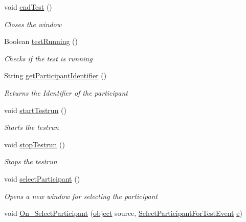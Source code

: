 \begin{DoxyCompactItemize}
void \hyperlink{class_web_analyzer_1_1_u_i_1_1_interaction_objects_1_1_testrun_control_afa240c157d4dca3e5399625cf59afd8c}{end\+Test} ()
\begin{DoxyCompactList}\small\item\em Closes the window \end{DoxyCompactList}\item 
Boolean \hyperlink{class_web_analyzer_1_1_u_i_1_1_interaction_objects_1_1_testrun_control_ae1dacc2d3e11d88116b3dbf9c45ea403}{test\+Running} ()
\begin{DoxyCompactList}\small\item\em Checks if the test is running \end{DoxyCompactList}\item 
String \hyperlink{class_web_analyzer_1_1_u_i_1_1_interaction_objects_1_1_testrun_control_a91ae8944392f8e0aef79106e157091a6}{get\+Participant\+Identifier} ()
\begin{DoxyCompactList}\small\item\em Returns the Identifier of the participant \end{DoxyCompactList}\item 
void \hyperlink{class_web_analyzer_1_1_u_i_1_1_interaction_objects_1_1_testrun_control_af27f7dfe9f65ab63b139bc58873eb689}{start\+Testrun} ()
\begin{DoxyCompactList}\small\item\em Starts the testrun \end{DoxyCompactList}\item 
void \hyperlink{class_web_analyzer_1_1_u_i_1_1_interaction_objects_1_1_testrun_control_a5f0c295b6abbeade6416f7a8fec63d70}{stop\+Testrun} ()
\begin{DoxyCompactList}\small\item\em Stops the testrun \end{DoxyCompactList}\item 
void \hyperlink{class_web_analyzer_1_1_u_i_1_1_interaction_objects_1_1_testrun_control_ad6ef95e986f389417a22a36b6e95ef36}{select\+Participant} ()
\begin{DoxyCompactList}\small\item\em Opens a new window for selecting the participant \end{DoxyCompactList}\item 
void \hyperlink{class_web_analyzer_1_1_u_i_1_1_interaction_objects_1_1_testrun_control_aa6efe805f8e05a4fb701e214d8e53bec}{On\+\_\+\+Select\+Participant} (\hyperlink{_u_i_2_h_t_m_l_resources_2js_2lib_2underscore_8min_8js_aae18b7515bb2bc4137586506e7c0c903}{object} source, \hyperlink{class_web_analyzer_1_1_events_1_1_select_participant_for_test_event}{Select\+Participant\+For\+Test\+Event} \hyperlink{_u_i_2_h_t_m_l_resources_2js_2lib_2bootstrap_8min_8js_ab5902775854a8b8440bcd25e0fe1c120}{e})

\end{DoxyCompactItemize}
